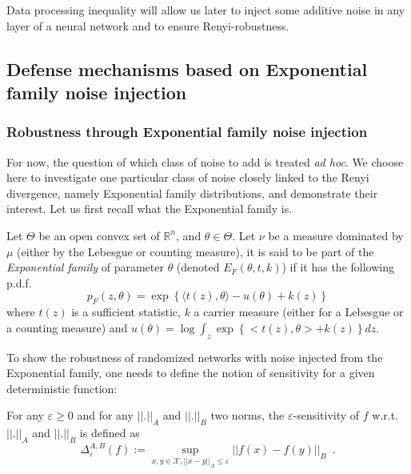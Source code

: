 Data processing inequality will allow us later to inject some additive noise in any layer of a neural network and to ensure Renyi-robustness.

\subsection{Defense mechanisms based on  Exponential family noise injection}
\label{sec:main_result}
\subsubsection{Robustness through Exponential family noise injection}
For now, the question of which class of noise to add is treated \textit{ad hoc}. We choose here to investigate one particular class of noise closely linked to the Renyi divergence, namely Exponential family distributions, and demonstrate their interest.
Let us first recall what the Exponential family is.

\begin{definition}
Let $\Theta$ be an open convex set of $\mathbb{R}^{n}$, and $\theta \in \Theta$. Let $\nu$ be a measure dominated by $\mu$ (either by the Lebesgue or counting measure), it is said to be part of the \emph{Exponential family} of parameter $\theta$ (denoted $E_{F}(\theta,t,k)$) if it has the following p.d.f.
$$p_{F}(z,\theta)=\exp\left\{ \langle t(z),\theta \rangle -u(\theta) +k(z) \right\} $$
where $t(z)$ is a sufficient statistic, $k$ a carrier measure (either for a Lebesgue or a counting measure) and $u(\theta)= \log \int_{z} \exp\left\{ <t(z),\theta> +k(z) \right\} dz $.

\end{definition}

To show the robustness of randomized networks with noise injected from the Exponential family, one needs to define the notion of sensitivity for a given deterministic function:
\begin{definition}
For any $\varepsilon\geq0$ and for any $||.||_A$ and $||.||_B$ two norms, the $\varepsilon$-sensitivity of $f$ w.r.t. $||.||_A$ and $||.||_B$ is defined as $$\Delta^{A,B}_\varepsilon(f):=\sup\limits_{ x,y \in \mathcal{X}, ||x-y||_{A} \leq \varepsilon} ||f(x) - f(y) ||_B \enspace.$$
\end{definition}

